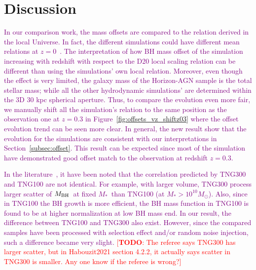\documentclass[twocolumn]{aastex631}
\newcommand{\todo}[1]{\textcolor{red}{[{\bf TODO}: #1]}}
\newcommand{\red}[1]{\textcolor{purple}{#1}}
\def\smass{{$M_*$}}
\def\mbh{$M_{\rm BH}$}
\begin{document}
\section{Discussion} \label{sec:dis}
\red{In our comparison work, the mass offsets are compared to the relation derived in the local Universe. In fact, the different simulations could have different mean relations at $z=0$~\citep[e.g.,][]{Habouzit2021}. The interpretation of how BH mass offset of the simulation increasing with redshift with respect to the D20 local scaling relation can be different than using the simulations' own local relation. Moreover, even though the effect is very limited, the galaxy mass of the Horizon-AGN sample is the total stellar mass; while all the other hydrodynamic simulations' are determined within the 3D 30 kpc spherical aperture. Thus, to compare the evolution even more fair, we manually shift all the simulation's relation to the same position as the observation one at $z=0.3$ in Figure~\ref{fig:offsets_vz_shiftz03} where the offset evolution trend can be seen more clear. In general, the new result show that the evolution for the simulations are consistent with our interpretations in Section~\ref{subsec:offset}. This result can be expected since most of the simulation have demonstrated good offset match to the observation at redshift $z=0.3$. } %


\red{In the literature~\citep{Weinberger2018, Habouzit2021}, it have been noted that the correlation predicted by TNG300 and TNG100 are not identical. For example, with larger volume, TNG300 process larger scatter of \mbh\ at fixed \smass\ than TNG100 (at \smass  $>10^{10}M_{\odot}$). Also, since in TNG100 the BH growth is more efficient, the BH mass function in TNG100 is found to be at higher normalization at low BH mass end. In our result, the difference between TNG100 and TNG300 also exist. However, since the compared samples have been processed with selection effect and/or random noise injection, such a difference became very slight.}
\todo{The referee says TNG300 has larger scatter, but in Habouzit2021 section 4.2.2, it actually says scatter in TNG300 is smaller. Any one know if the referee is wrong?}
\end{document}
